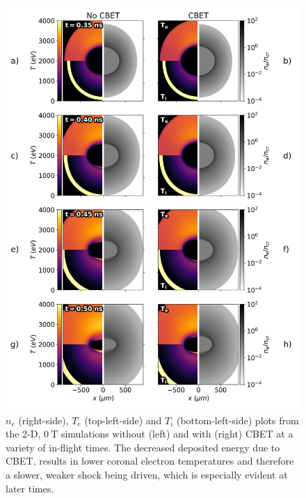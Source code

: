 \begin{figure}[t!]
    \includegraphics[width=0.95\linewidth]{Results2/Images/unmag_CBET_onoff.png}
    \centering
    \caption{$n_e$ (right-side), $T_e$ (top-left-side) and $T_i$ (bottom-left-side) plots from the 2-D, $0\ \text{T}$ simulations without (left) and with (right) \ac{CBET} at a variety of in-flight times.
    The decreased deposited energy due to \ac{CBET}, results in lower coronal electron temperatures and therefore a slower, weaker shock being driven, which is especially evident at later times.}%
    \label{fig:Res2_unmag_CBET_onoff}
\end{figure}



